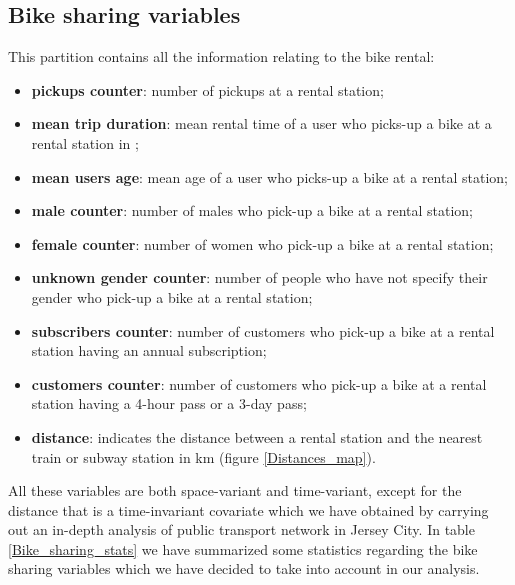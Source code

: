 \subsection{Bike sharing variables}
This partition contains all the information relating to the bike rental: 
\begin{itemize}
	\item \textbf{pickups counter}: number of pickups at a rental station;
	\item \textbf{mean trip duration}: mean rental time of a user who picks-up a bike at a rental station in \si{\min};
	\item \textbf{mean users age}: mean age of a user who picks-up a bike at a rental station;
	\item \textbf{male counter}: number of males who pick-up a bike at a rental station;
	\item \textbf{female counter}: number of women who pick-up a bike at a rental station;
	\item \textbf{unknown gender counter}: number  of people who have not specify their gender who pick-up a bike at a rental station;
	\item \textbf{subscribers counter}: number of customers who pick-up a bike at a rental station having an annual subscription;
	\item \textbf{customers counter}: number of customers who pick-up a bike at a rental station having a \num{4}-hour pass or a \num{3}-day pass;
	\item \textbf{distance}: indicates the distance between a rental station and the nearest train or subway station in \unit{\kilo\meter} (figure \ref{Distances_map}).
	
\end{itemize}
All these variables are both space-variant and time-variant, except for the distance that is a time-invariant covariate which we have obtained by carrying out an in-depth analysis of public transport network in Jersey City. In table \ref{Bike_sharing_stats} we have summarized some statistics regarding the bike sharing variables which we have decided to take into account in our analysis.

